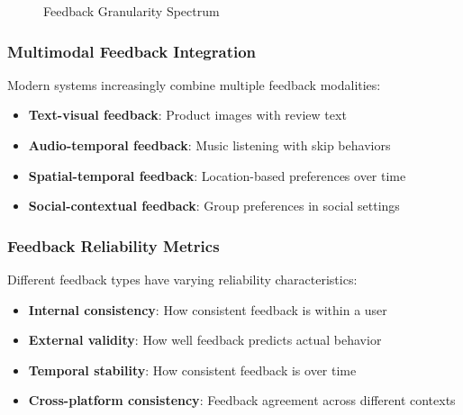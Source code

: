 \documentclass[acmsmall,review,anonymous]{acmart}
\begin{document}
\begin{figure}[h]
\centering
{}
\caption{Feedback Granularity Spectrum}
\label{fig:granularity_spectrum}
\end{figure}

\subsubsection{Multimodal Feedback Integration}

Modern systems increasingly combine multiple feedback modalities:
\begin{itemize}
    \item \textbf{Text-visual feedback}: Product images with review text
    \item \textbf{Audio-temporal feedback}: Music listening with skip behaviors
    \item \textbf{Spatial-temporal feedback}: Location-based preferences over time
    \item \textbf{Social-contextual feedback}: Group preferences in social settings
\end{itemize}

\subsubsection{Feedback Reliability Metrics}

Different feedback types have varying reliability characteristics:
\begin{itemize}
    \item \textbf{Internal consistency}: How consistent feedback is within a user
    \item \textbf{External validity}: How well feedback predicts actual behavior
    \item \textbf{Temporal stability}: How consistent feedback is over time
    \item \textbf{Cross-platform consistency}: Feedback agreement across different contexts
\end{itemize}
\end{document}
